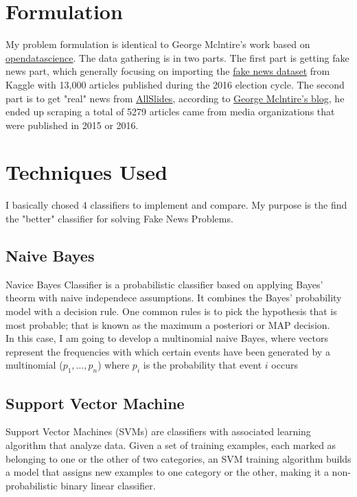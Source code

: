 \documentclass[twoside,twocolumn]{article}
\begin{document}
    \section{Formulation}
    My problem formulation is identical to George Mclntire's work based on 
    \href{https://opendatascience.com/blog/how-to-build-a-fake-news-classification-model/}{opendatascience}. 
    The data gathering is in two parts. The first part is getting fake news part, which generally 
    focusing on importing the \href{https://www.kaggle.com/mrisdal/fake-news}
    {fake news dataset} from Kaggle with 13,000 articles published during the 2016 election cycle. The second
    part is to get "real" news from \href{https://www.allsides.com/unbiased-balanced-news}{AllSlides}, according to
    \href{https://opendatascience.com/blog/how-to-build-a-fake-news-classification-model/}{George Mclntire's blog},
    he ended up scraping a total of 5279 articles came from media organizations that were published in 2015 or 2016. 
    

    \section{Techniques Used}
    I basically chosed 4 classifiers to implement and compare. My purpose is the find the "better" classifier
    for solving Fake News Problems.
    \subsection{Naive Bayes}
    Navice Bayes Classifier is a probabilistic classifier based on applying Bayes' theorm with naive independece
    assumptions. It combines the Bayes' probability model with a decision rule. One common rules is to pick the 
    hypothesis that is most probable; that is known as the maximum a posteriori or MAP decision.
    \\ In this case, I am going to develop a multinomial naive Bayes, where vectors represent the frequencies 
    with which certain events have been generated by a multinomial ($p_{1},\dots ,p_{n}$) where 
    $p_{i}$ is the probability that event $i$ occurs

    \subsection{Support Vector Machine}
    Support Vector Machines (SVMs) are classifiers with associated learning algorithm that analyze data. Given 
    a set of training examples, each marked as belonging to one or the other of two categories, an SVM training 
    algorithm builds a model that assigns new examples to one category or the other, making it a non-probabilistic 
    binary linear classifier.
\end{document}
